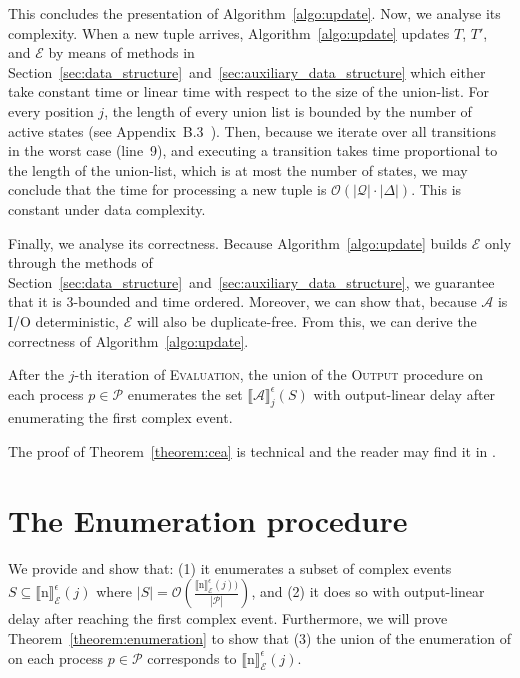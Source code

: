 This concludes the presentation of Algorithm~\ref{algo:update}. Now, we analyse its complexity. When a new tuple arrives, Algorithm~\ref{algo:update} updates $T$, $T'$, and $\mathcal{E}$ by means of methods in Section~\ref{sec:data_structure}~and~\ref{sec:auxiliary_data_structure} which either take constant time or linear time with respect to the size of the union-list. For every position $j$, the length of every union list is bounded by the number of active states (see Appendix~B.3~\cite{core}). Then, because we iterate over all transitions in the worst case (line~9), and executing a transition takes time proportional to the length of the union-list, which is at most the number of states, we may conclude that the time for processing a new tuple is $\mathcal{O}(|\mathcal{Q}| \cdot |\Delta|)$. This is constant under data complexity.

Finally, we analyse its correctness. Because Algorithm~\ref{algo:update} builds $\mathcal{E}$ only through the methods of Section~\ref{sec:data_structure}~and~\ref{sec:auxiliary_data_structure}, we guarantee that it is $3$-bounded and time ordered. Moreover, we can show that, because $\mathcal{A}$ is I/O deterministic, $\mathcal{E}$ will also be duplicate-free. From this, we can derive the correctness of Algorithm~\ref{algo:update}.

\begin{theorem}\label{theorem:cea}
  After the $j$-th iteration of \textsc{Evaluation}, the union of the \textsc{Output} procedure on each process $p \in \mathcal{P}$ enumerates the set ${\llbracket \mathcal{A} \rrbracket}^{\epsilon}_{j}(S)$ with output-linear delay after enumerating the first complex event.
\end{theorem}

The proof of Theorem~\ref{theorem:cea} is technical and the reader may find it in \cite{core}.

\section{The Enumeration procedure}\label{sec:enumeration}

We provide  and show that: (1) it enumerates a subset of complex events $S \subseteq {\llbracket \text{n} \rrbracket}^{\epsilon}_{\mathcal{E}}(j)$ where $|S| = \mathcal{O}(\frac{{\llbracket \text{n} \rrbracket}^{\epsilon}_{\mathcal{E}}(j))}{|\mathcal{P}|})$, and (2) it does so with output-linear delay after reaching the first complex event. Furthermore, we will prove Theorem~\ref{theorem:enumeration} to show that (3) the union of the enumeration of  on each process $p \in \mathcal{P}$ corresponds to ${\llbracket \text{n} \rrbracket}^{\epsilon}_{\mathcal{E}}(j)$.

